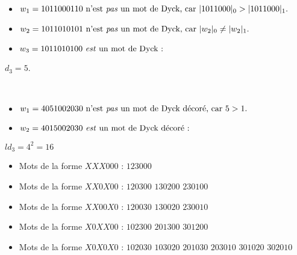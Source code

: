 \begin{example}[Définition 5 : $n = 5$]
    ~
    \begin{itemize}
        \item $w_1 = 1011000110 \text{ n'est \emph{pas} un mot de Dyck,
        car } |1011000|_0 > |1011000|_1.$
        \item $w_2 = 1011010101 \text{ n'est \emph{pas} un mot de Dyck,
        car } |w_2|_0 \neq |w_2|_1.$
        \item $w_3 = 1011010100 \text{ \emph{est} un mot de Dyck : }$
    \end{itemize}
    
\end{example}

\begin{example}[Théorème 6 : $n = 3$]
    $d_3 = 5$.
    \begin{center}
        
    \end{center}
\end{example}

\begin{example}[Définition 7 : $n = 5$]
    ~
    \begin{itemize}
        \item $w_1 = 4051002030 \text{ n'est \emph{pas} un mot de Dyck
            décoré, car } 5 > 1.$
        \item $w_2 = 4015002030 \text{ \emph{est} un mot de Dyck décoré :}$
    \end{itemize}
    
\end{example}

\begin{example}[Théorème 8 : $n = 3$]
    $ld_3 = 4^2 = 16$
    \begin{itemize}
        \item Mots de la forme $XXX000$ :
            \subitem $123000$
        \item Mots de la forme $XX0X00$ :
            \subitem $120300$
            \hspace{2cm} $130200$
            \hspace{2cm} $230100$
        \item Mots de la forme $XX00X0$ :
            \subitem $120030$
            \hspace{2cm} $130020$
            \hspace{2cm} $230010$
        \item Mots de la forme $X0XX00$ :
            \subitem $102300$
            \hspace{2cm} $201300$
            \hspace{2cm} $301200$
        \item Mots de la forme $X0X0X0$ :
            \subitem $102030$
            \hspace{2cm} $103020$
            \hspace{2cm} $201030$
            \subitem $203010$
            \hspace{2cm} $301020$
            \hspace{2cm} $302010$
    \end{itemize}
    
\end{example}